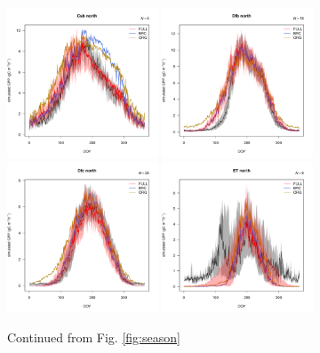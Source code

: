 \documentclass{myreport}
\begin{document}
 \begin{figure}[!ht]
    \centering
\includegraphics[width=0.4\textwidth]{fig/meandoy_byzone_Csb_north_FULL.pdf}
\includegraphics[width=0.4\textwidth]{fig/meandoy_byzone_Dfb_north_FULL.pdf}\\
\includegraphics[width=0.4\textwidth]{fig/meandoy_byzone_Dfc_north_FULL.pdf}
\includegraphics[width=0.4\textwidth]{fig/meandoy_byzone_ET_north_FULL.pdf}
    \caption{Continued from Fig. \ref{fig:season}}
    \label{fig:season2}
\end{figure}
\end{document}
